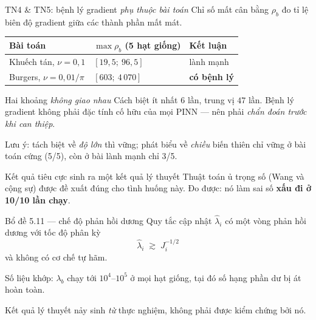 \documentclass[aspectratio=169,11pt]{beamer}
\newcommand{\bad}[1]{\textcolor{bad}{\textbf{#1}}}
\begin{document}
\begin{frame}{TN4 \& TN5: bệnh lý gradient \emph{phụ thuộc bài toán}}
Chỉ số mất cân bằng $\rho_b$ đo tỉ lệ biên độ gradient giữa các thành phần mất mát.

\medskip
\begin{table}
\small
\begin{tabular}{@{}lll@{}}
\toprule
\textbf{Bài toán} & $\max\rho_b$ (5 hạt giống) & \textbf{Kết luận} \\
\midrule
Khuếch tán, $\nu = 0{,}1$ & $[19{,}5;\ 96{,}5]$   & lành mạnh \\
Burgers, $\nu = 0{,}01/\pi$ & $[603;\ 4\,070]$    & \bad{có bệnh lý} \\
\bottomrule
\end{tabular}
\end{table}

\medskip
\begin{alertblock}{Hai khoảng \emph{không giao nhau}}
Cách biệt ít nhất $6$ lần, trung vị $47$ lần.
Bệnh lý gradient \alert{không phải đặc tính cố hữu của mọi PINN} ---
nên phải \emph{chẩn đoán trước khi can thiệp}.
\end{alertblock}

\footnotesize
Lưu ý: tách biệt về \emph{độ lớn} thì vững; phát biểu về \emph{chiều} biến thiên
chỉ vững ở bài toán cứng (5/5), còn ở bài lành mạnh chỉ 3/5.
\end{frame}

\begin{frame}{Kết quả tiêu cực sinh ra một kết quả lý thuyết}
\small
Thuật toán ủ trọng số (Wang và cộng sự) được đề xuất đúng cho tình huống này.
Đo được: nó làm sai số \bad{xấu đi ở 10/10 lần chạy}.

\medskip
\begin{alertblock}{Bổ đề 5.11 --- chế độ phản hồi dương}
Quy tắc cập nhật $\hat\lambda_i$ có một vòng phản hồi dương với tốc độ phân kỳ
\[
\hat\lambda_i \;\gtrsim\; J_i^{-1/2}
\]
và \alert{không có cơ chế tự hãm}.
\end{alertblock}

\medskip
Số liệu khớp: $\lambda_b$ chạy tới $10^4$--$10^5$ ở mọi hạt giống, tại đó số hạng
phần dư bị át hoàn toàn.

\centering
\alert{Kết quả lý thuyết nảy sinh \emph{từ} thực nghiệm,
không phải được kiểm chứng bởi nó.}
\end{frame}
\end{document}
